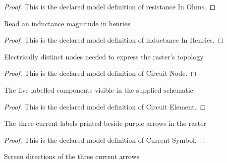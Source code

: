 \begin{proof}
  This is the declared model definition of resistance In Ohms.
\end{proof}
\begin{definition}
  \label{def:physics:phyx-mini-0984:phyxminiproblems-problemphyxmini0984-inductanceinhenries}
  Read an inductance magnitude in henries
\end{definition}
\begin{proof}
  This is the declared model definition of inductance In Henries.
\end{proof}
\begin{definition}
  \label{def:physics:phyx-mini-0984:phyxminiproblems-problemphyxmini0984-circuitnode}
  Electrically distinct nodes needed to express the raster's topology
\end{definition}
\begin{proof}
  This is the declared model definition of Circuit Node.
\end{proof}
\begin{definition}
  \label{def:physics:phyx-mini-0984:phyxminiproblems-problemphyxmini0984-circuitelement}
  The five labelled components visible in the supplied schematic
\end{definition}
\begin{proof}
  This is the declared model definition of Circuit Element.
\end{proof}
\begin{definition}
  \label{def:physics:phyx-mini-0984:phyxminiproblems-problemphyxmini0984-currentsymbol}
  The three current labels printed beside purple arrows in the raster
\end{definition}
\begin{proof}
  This is the declared model definition of Current Symbol.
\end{proof}
\begin{definition}
  \label{def:physics:phyx-mini-0984:phyxminiproblems-problemphyxmini0984-arrowdirection}
  Screen directions of the three current arrows
\end{definition}
